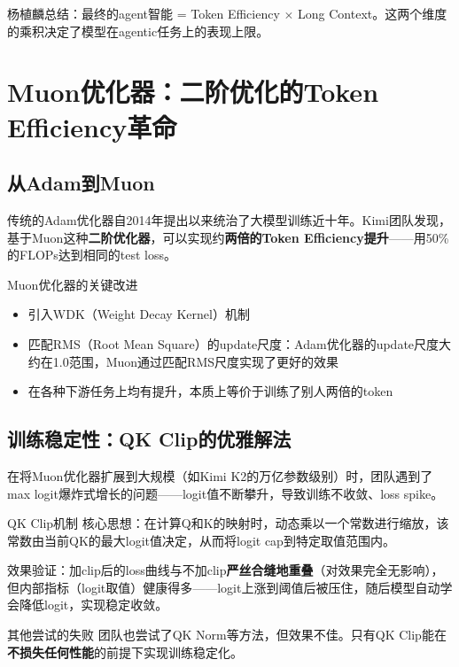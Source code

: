 \documentclass[a4paper]{article}
\begin{document}
杨植麟总结：最终的agent智能 = Token Efficiency $\times$ Long Context。这两个维度的乘积决定了模型在agentic任务上的表现上限。


\section{Muon优化器：二阶优化的Token Efficiency革命}

\subsection{从Adam到Muon}

传统的Adam优化器自2014年提出以来统治了大模型训练近十年。Kimi团队发现，基于Muon这种\textbf{二阶优化器}，可以实现约\textbf{两倍的Token Efficiency提升}——用50\%的FLOPs达到相同的test loss。

\begin{importantbox}{Muon优化器的关键改进}
\begin{itemize}
\item 引入WDK（Weight Decay Kernel）机制
\item 匹配RMS（Root Mean Square）的update尺度：Adam优化器的update尺度大约在1.0范围，Muon通过匹配RMS尺度实现了更好的效果
\item 在各种下游任务上均有提升，本质上等价于训练了别人两倍的token
\end{itemize}
\end{importantbox}

\subsection{训练稳定性：QK Clip的优雅解法}

在将Muon优化器扩展到大规模（如Kimi K2的万亿参数级别）时，团队遇到了max logit爆炸式增长的问题——logit值不断攀升，导致训练不收敛、loss spike。

\begin{knowledgebox}{QK Clip机制}
核心思想：在计算Q和K的映射时，动态乘以一个常数进行缩放，该常数由当前QK的最大logit值决定，从而将logit cap到特定取值范围内。

效果验证：加clip后的loss曲线与不加clip\textbf{严丝合缝地重叠}（对效果完全无影响），但内部指标（logit取值）健康得多——logit上涨到阈值后被压住，随后模型自动学会降低logit，实现稳定收敛。
\end{knowledgebox}

\begin{warningbox}{其他尝试的失败}
团队也尝试了QK Norm等方法，但效果不佳。只有QK Clip能在\textbf{不损失任何性能}的前提下实现训练稳定化。
\end{warningbox}
\end{document}
